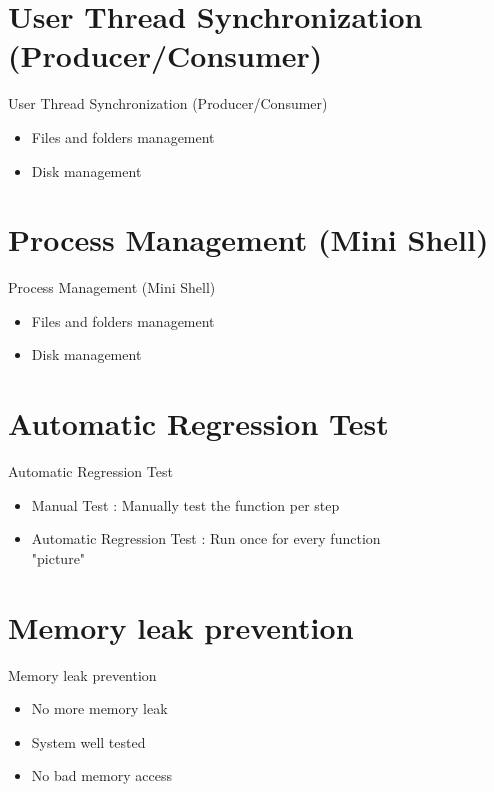 \documentclass{beamer}
\begin{document}
\section{User Thread Synchronization (Producer/Consumer)}
\begin{frame}{User Thread Synchronization (Producer/Consumer)}
  \begin{itemize}
    \item Files and folders management
    \item Disk management
  \end{itemize}
\end{frame}
\section{Process Management (Mini Shell)}
\begin{frame}{Process Management (Mini Shell)}
  \begin{itemize}
    \item Files and folders management
    \item Disk management
  \end{itemize}
\end{frame}
\section{Automatic Regression Test}
\begin{frame}{Automatic Regression Test}
  \begin{itemize}
    \item Manual Test : Manually test the function per step
    \item Automatic Regression Test : Run once for every function
    \\"picture"
  \end{itemize}
\end{frame}
\section{Memory leak prevention}
\begin{frame}{Memory leak prevention}
  \begin{itemize}
    \item No more memory leak
    \item System well tested
    \item No bad memory access
  \end{itemize}
\end{frame}
\end{document}
